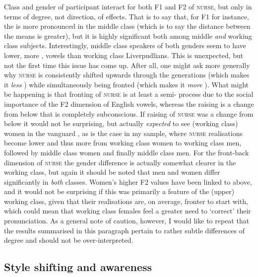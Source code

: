 Class and gender of participant interact for both F1 and F2 of \textsc{nurse}, but only in terms of degree, not direction, of effects.
That is to say that, for F1 for instance, the  is more pronounced in the middle class (which is to say the distance between the means is greater), but it is highly significant both among middle \emph{and} working class subjects.
Interestingly, middle class speakers of both genders seem to have lower, more , vowels than working class Liverpudlians.
This is unexpected, but not the first time this issue has come up.
After all, one might ask more generally why \textsc{nurse} is consistently shifted upwards through the generations (which makes it \emph{less} ) while simultaneously being fronted (which makes it \emph{more} ).
What might be happening is that fronting of \textsc{nurse} is at least a semi- process due to the social importance of the F2 dimension of English vowels, whereas the raising is a change from below that is completely subconscious.
If raising of \textsc{nurse} was a change from below it would not be surprising, but actually \emph{expected} to see (working class) women in the vanguard \parencite[cf.][292--293]{labov2001a}, as is the case in my sample, where \textsc{nurse} realisations become lower and thus more  from working class women to working class men, followed by middle class women and finally middle class men.
For the front-back dimension of \textsc{nurse} the gender difference is actually somewhat clearer in the working class, but again it should be noted that men and women differ significantly in \emph{both} classes.
Women's higher F2 values have been linked to  above, and it would not be surprising if this was primarily a feature of the (upper) working class, given that their realisations are, on average, fronter to start with, which could mean that working class females feel a greater need to `correct' their pronunciation.
As a general note of caution, however, I would like to repeat that the results summarised in this paragraph pertain to rather subtle differences of degree and should not be over-interpreted.

\subsection{Style shifting and awareness}
\label{prod.disc.nurse.style}

